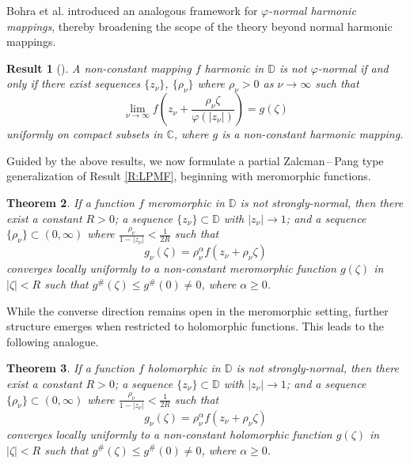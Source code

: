 \documentclass[11pt, reqno]{amsart}
\newtheorem{theorem}{Theorem}[section]
\newtheorem{Result}[theorem]{Result}
\theoremstyle{definition}
\theoremstyle{remark}
\numberwithin{equation}{section}
\begin{document}
Bohra et al. introduced an analogous framework for \emph{$\varphi$-normal harmonic mappings}, thereby
broadening the scope of the theory beyond normal harmonic mappings.
\begin{Result}[{\cite[Theorem 1.3]{bohra-lfptfpnhm-2025}}] \label{R:LPPNHM}
A non-constant mapping $f$ harmonic in $\mathbb D$ is not $\varphi$-normal if and only if there exist sequences $\{z_{\nu}\}$, $\{\rho_{\nu} \}$ where $\rho_{\nu} >0$ as $\nu\to\infty$ such that 
\begin{equation*}\lim_{\nu\to\infty} f\left(z_{\nu}+\frac{\rho_{\nu} \zeta}{\varphi(|z_{\nu}|)}\right)=g(\zeta)\end{equation*}
uniformly on compact subsets in $\mathbb C$, where $g$ is a non-constant harmonic mapping.
\end{Result}
Guided by the above results, we now formulate a partial Zalcman\,–\,Pang type generalization of Result \ref{R:LPMF}, beginning with meromorphic functions.
\begin{theorem} \label{T:FPZPSNMF}
    If a function $f$ meromorphic in $\mathbb D$ is not strongly-normal, then there exist a constant 
    $R>0$; a sequence $\{z_{\nu}\}\subset \mathbb D$ with $|z_{\nu}|\to1$; and a sequence 
    $\{\rho_{\nu} \}\subset (0,\infty)$ where $\displaystyle\frac{\rho_{\nu} }{1-|z_{\nu}|}<\frac{1}{2R}$ 
    such that \begin{equation*}g_{\nu}(\zeta)=\rho_{\nu} ^{\alpha}f(z_{\nu}+\rho_{\nu} \zeta)\end{equation*}
    converges locally uniformly to a non-constant meromorphic function $g(\zeta)$ in $|\zeta|<R$ 
    such that $g^\#(\zeta)\le g^\#(0)\neq 0$, where $\alpha\geq 0$. 
\end{theorem}
While the converse direction remains open in the meromorphic setting, further structure emerges when
restricted to holomorphic functions. This leads to the following analogue.
\begin{theorem} \label{T:FPZPSNHF}
 If a function $f$ holomorphic in $\mathbb D$ is not strongly-normal, then there exist a constant $R>0$; 
 a sequence $\{z_{\nu}\}\subset \mathbb D$ with $|z_{\nu}|\to1$; and a sequence $\{\rho_{\nu} \}\subset (0,\infty)$ where
 $\displaystyle\frac{\rho_{\nu} }{1-|z_{\nu}|}<\frac{1}{2R}$ such that \begin{equation*}g_{\nu}(\zeta)=\rho_{\nu} ^{\alpha}f(z_{\nu}+\rho_{\nu} \zeta)\end{equation*}
    converges locally uniformly to a non-constant holomorphic function $g(\zeta)$ in $|\zeta|<R$ 
    such that $g^\#(\zeta)\le g^\#(0)\neq 0$, where $\alpha\geq 0$.
\end{theorem}   
\end{document}
